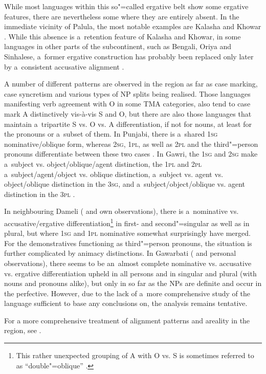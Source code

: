 While most languages within this so"=called ergative belt show some ergative features, there are nevertheless some where they are entirely absent. In the immediate vicinity of Palula, the most notable examples are Kalasha and Khowar \citep[41]{bashir1988}. While this absence is a~retention feature of Kalasha and Khowar, in some languages in other parts of the subcontinent, such as Bengali, Oriya and Sinhalese, a~former ergative construction has probably been replaced only later by a~consistent accusative alignment \citep[343--344]{masica1991}.



A number of different patterns are observed in the region as far as case marking, case syncretism and various types of NP splits being realised. Those languages manifesting verb agreement with O in some TMA categories, also tend to case mark A distinctively vis-à-vis S and O, but there are also those languages that maintain a~tripartite S vs. O vs. A differentiation, if not for nouns, at least for the pronouns or a~subset of them. In Punjabi, there is a~shared \textsc{1sg} nominative/oblique form, whereas \textsc{2sg}, \textsc{1pl}, as well as \textsc{2pl} and the third"=person pronouns differentiate between these two cases \citep[229]{bhatia1993}. In Gawri, the \textsc{1sg} and \textsc{2sg} make a~subject vs. object/oblique/agent distinction, the \textsc{1pl} and \textsc{2pl} a~subject/agent/object vs. oblique distinction, a~subject vs. agent vs. object/oblique distinction in the \textsc{3sg}, and a~subject/object/oblique vs. agent distinction in the \textsc{3pl} \citep[39]{baart1999a}. 



In neighbouring Dameli (\citealt{morgenstierne1942} and own observations), there is a~nominative vs. accusative/ergative differentiation\footnote{This rather unexpected grouping of A with O vs. S is sometimes referred to as ``double"=oblique'' \citep{payne1980}.} in first- and second"=singular as well as in plural, but where \textsc{1sg} and \textsc{1pl} nominative somewhat surprisingly have merged. For the demonstratives functioning as third"=person pronouns, the situation is further complicated by animacy distinctions. In Gawarbati (\citealt{morgenstierne1950} and personal observations), there seems to be an~almost complete nominative vs. accusative vs. ergative differentiation upheld in all persons and in singular and plural (with nouns and pronouns alike), but only in so far as the NPs are definite and occur in the perfective. However, due to the lack of a~more comprehensive study of the language sufficient to base any conclusions on, the analysis remains tentative. 
 

For a more comprehensive treatment of alignment patterns and areality in the region, see \citet{liljegren2014}. 